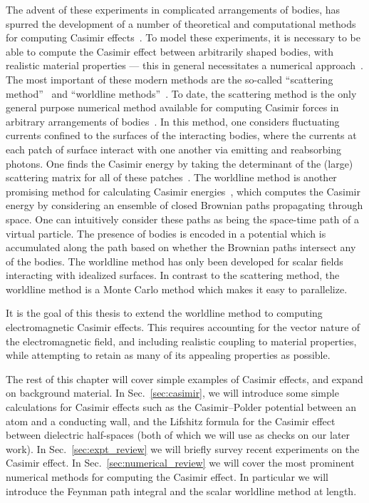 The advent of these experiments in complicated arrangements of bodies, has spurred the development
of a number of theoretical and computational methods for computing Casimir effects~\cite{Dalvit2011,Bordag2009}. 
To model these experiments, it is necessary to be able to compute the Casimir effect between arbitrarily shaped bodies, with 
realistic material properties --- this in general necessitates a numerical approach~\cite{Johnson2011}.
The most important of these modern methods are the so-called ``scattering method''~\cite{Lambrecht2006,Rahi2009,Reid2009}
 and ``worldline methods''~\cite{Gies2003}.  To date, the scattering method is the only general purpose numerical method available for computing
Casimir forces in arbitrary arrangements of bodies~\cite{Reid2009,Reid2011,Reid2013}.  
In this method, one considers fluctuating currents confined to the surfaces of the interacting bodies,
where the currents at each patch of surface interact with one another via emitting and reabsorbing photons.
 One finds the Casimir energy by taking the determinant of the (large) scattering matrix for all of these patches~\cite{Reid2011}.  
The worldline method is another promising method for calculating Casimir energies~\cite{Gies2003},
which computes the Casimir energy by considering an ensemble of closed 
Brownian paths propagating through space.
 One can intuitively consider these paths as being the space-time path of a virtual particle.
 The presence of bodies is encoded in a potential which is
accumulated along the path based on whether the Brownian paths intersect any of the bodies.
The worldline method has only been developed for scalar fields interacting with idealized surfaces.
In contrast to the scattering method, the worldline method is a Monte Carlo method which makes it 
easy to parallelize.  

It is the goal of this thesis to extend the worldline method to computing electromagnetic Casimir effects.
This requires accounting for the vector nature of the electromagnetic field, and including realistic coupling to 
material properties, while attempting to retain as many of its appealing properties as possible.    

The rest of this chapter will cover simple examples of Casimir effects, and expand on background material.
In Sec.~\ref{sec:casimir}, we will introduce some simple calculations for Casimir effects such as
the Casimir--Polder potential between an atom and a conducting wall, and the Lifshitz formula for the Casimir
effect between dielectric half-spaces (both of which we will use as checks on our later work).
In Sec.~\ref{sec:expt_review} we will briefly survey recent experiments on the Casimir effect.
In Sec.~\ref{sec:numerical_review} we will cover the most prominent numerical methods for computing the Casimir effect.
In particular we will introduce the Feynman path integral and the scalar worldline method at length.  

